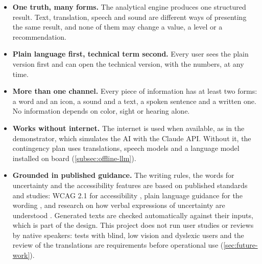 \begin{itemize}
\item \textbf{One truth, many forms.} The analytical engine produces one structured result. Text, translation, speech and sound are different ways of presenting the same result, and none of them may change a value, a level or a recommendation.
\item \textbf{Plain language first, technical term second.} Every user sees the plain version first and can open the technical version, with the numbers, at any time.
\item \textbf{More than one channel.} Every piece of information has at least two forms: a word and an icon, a sound and a text, a spoken sentence and a written one. No information depends on color, sight or hearing alone.
\item \textbf{Works without internet.} The internet is used when available, as in the demonstrator, which simulates the AI with the Claude API. Without it, the contingency plan uses translations, speech models and a language model installed on board (\ref{subsec:offline-llm}).
\item \textbf{Grounded in published guidance.} The writing rules, the words for uncertainty and the accessibility features are based on published standards and studies: WCAG 2.1 for accessibility \cite{w3c_wcag21}, plain language guidance for the wording \cite{plain_language_guide}, and research on how verbal expressions of uncertainty are understood \cite{budescu2009uncertainty,mastrandrea2010ipcc}. Generated texts are checked automatically against their inputs, which is part of the design. This project does not run user studies or reviews by native speakers: tests with blind, low vision and dyslexic users and the review of the translations are requirements before operational use (\ref{sec:future-work}).
\end{itemize}

